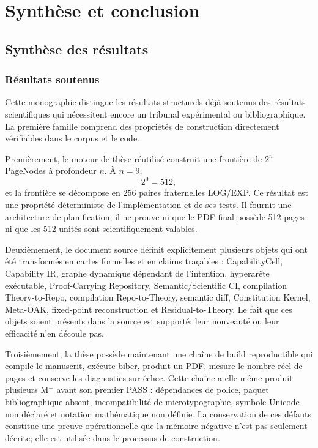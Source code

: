\part{Synthèse et conclusion}

\chapter{Synthèse des résultats}

\section{Résultats soutenus}

Cette monographie distingue les résultats structurels déjà soutenus des résultats scientifiques qui nécessitent encore un tribunal expérimental ou bibliographique. La première famille comprend des propriétés de construction directement vérifiables dans le corpus et le code.

Premièrement, le moteur de thèse réutilisé construit une frontière de $2^n$ PageNodes à profondeur $n$. À $n=9$,
\[
2^9=512,
\]
et la frontière se décompose en $256$ paires fraternelles LOG/EXP. Ce résultat est une propriété déterministe de l'implémentation et de ses tests. Il fournit une architecture de planification; il ne prouve ni que le PDF final possède 512 pages ni que les 512 unités sont scientifiquement valables.

Deuxièmement, le document source définit explicitement plusieurs objets qui ont été transformés en cartes formelles et en claims traçables : CapabilityCell, Capability IR, graphe dynamique dépendant de l'intention, hyperarête exécutable, Proof-Carrying Repository, Semantic/Scientific CI, compilation Theory-to-Repo, compilation Repo-to-Theory, semantic diff, Constitution Kernel, Meta-OAK, fixed-point reconstruction et Residual-to-Theory. Le fait que ces objets soient présents dans la source est supporté; leur nouveauté ou leur efficacité n'en découle pas.

Troisièmement, la thèse possède maintenant une chaîne de build reproductible qui compile le manuscrit, exécute biber, produit un PDF, mesure le nombre réel de pages et conserve les diagnostics sur échec. Cette chaîne a elle-même produit plusieurs M$^-$ avant son premier PASS : dépendances de police, paquet bibliographique absent, incompatibilité de microtypographie, symbole Unicode non déclaré et notation mathématique non définie. La conservation de ces défauts constitue une preuve opérationnelle que la mémoire négative n'est pas seulement décrite; elle est utilisée dans le processus de construction.

